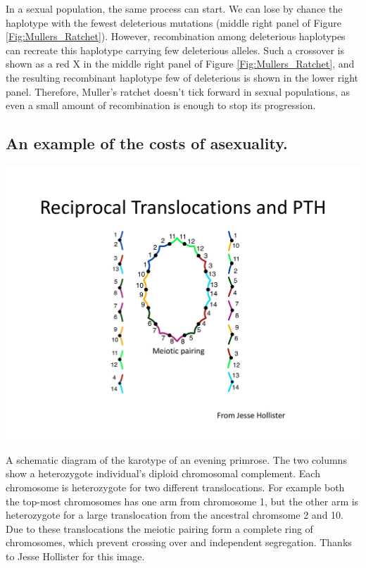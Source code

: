 In a sexual population, the same process can start. We can lose by chance the haplotype with the fewest deleterious mutations (middle right panel of Figure \ref{Fig:Mullers_Ratchet}). However, recombination among deleterious haplotypes can recreate this haplotype carrying few deleterious alleles. Such a crossover is shown as a red X in the middle right panel of  Figure \ref{Fig:Mullers_Ratchet}, and the resulting recombinant haplotype few of deleterious is shown in the lower right panel. Therefore, Muller's ratchet doesn't tick forward in sexual populations, as even a small amount of recombination is enough to stop its progression.  
\subsection{An example of the costs of asexuality.}

\begin{marginfigure}[0cm]
\begin{center}
  \includegraphics[width = \textwidth]{figures/Reciprocal_translocations_Hollister.pdf}
\end{center}
\caption{A schematic diagram of the karotype of an evening primrose. The two columns show a heterozygote individual's diploid chromosomal complement. Each chromosome is heterozygote for two different translocations. For example both the top-most chromosomes has one arm from chromosome 1, but the other arm is heterozygote for a large translocation from the ancestral chromsome 2 and 10. Due to these translocations the meiotic pairing form a complete ring of chromosomes, which prevent crossing over and independent segregation. Thanks to Jesse Hollister for this image. } \label{Fig:Reciprocal_translocation}  %
\end{marginfigure}

